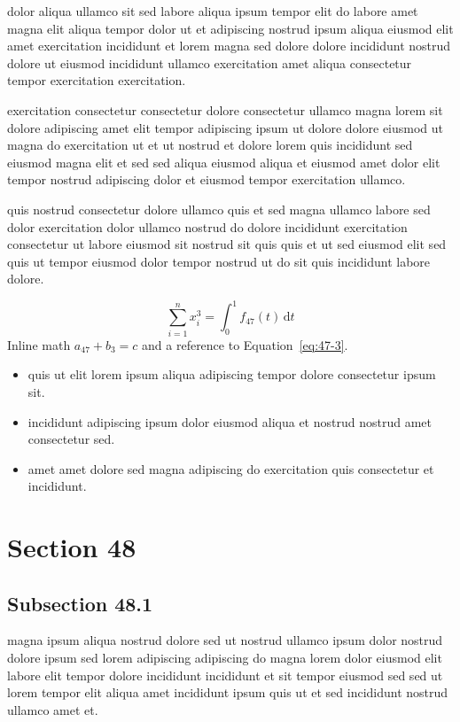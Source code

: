\documentclass{article}
\begin{document}
dolor aliqua ullamco sit sed labore aliqua ipsum tempor elit do labore amet magna elit aliqua tempor dolor ut et adipiscing nostrud ipsum aliqua eiusmod elit amet exercitation incididunt et lorem magna sed dolore dolore incididunt nostrud dolore ut eiusmod incididunt ullamco exercitation amet aliqua consectetur tempor exercitation exercitation.

exercitation consectetur consectetur dolore consectetur ullamco magna lorem sit dolore adipiscing amet elit tempor adipiscing ipsum ut dolore dolore eiusmod ut magna do exercitation ut et ut nostrud et dolore lorem quis incididunt sed eiusmod magna elit et sed sed aliqua eiusmod aliqua et eiusmod amet dolor elit tempor nostrud adipiscing dolor et eiusmod tempor exercitation ullamco.

quis nostrud consectetur dolore ullamco quis et sed magna ullamco labore sed dolor exercitation dolor ullamco nostrud do dolore incididunt exercitation consectetur ut labore eiusmod sit nostrud sit quis quis et ut sed eiusmod elit sed quis ut tempor eiusmod dolor tempor nostrud ut do sit quis incididunt labore dolore.

\begin{equation}\label{eq:47-3}
  \sum_{i=1}^{n} x_i^{3} = \int_0^1 f_{47}(t)\,\mathrm{d}t
\end{equation}
Inline math $a_{47} + b_{3} = c$ and a reference to Equation~\eqref{eq:47-3}.

\begin{itemize}
  \item quis ut elit lorem ipsum aliqua adipiscing tempor dolore consectetur ipsum sit.
  \item incididunt adipiscing ipsum dolor eiusmod aliqua et nostrud nostrud amet consectetur sed.
  \item amet amet dolore sed magna adipiscing do exercitation quis consectetur et incididunt.
\end{itemize}

\section{Section 48}\label{sec:48}
\subsection{Subsection 48.1}\label{sec:48-1}
magna ipsum aliqua nostrud dolore sed ut nostrud ullamco ipsum dolor nostrud dolore ipsum sed lorem adipiscing adipiscing do magna lorem dolor eiusmod elit labore elit tempor dolore incididunt incididunt et sit tempor eiusmod sed sed ut lorem tempor elit aliqua amet incididunt ipsum quis ut et sed incididunt nostrud ullamco amet et.
\end{document}
